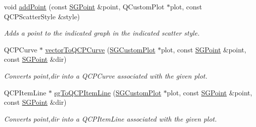 \begin{DoxyCompactItemize}
void \hyperlink{classSGSolutionHandler_a86d0a38bc3afbe289ddb0844d02f69bb}{add\+Point} (const \hyperlink{classSGPoint}{S\+G\+Point} \&point, Q\+Custom\+Plot $\ast$plot, const Q\+C\+P\+Scatter\+Style \&style)
\begin{DoxyCompactList}\small\item\em Adds a point to the indicated graph in the indicated scatter style. \end{DoxyCompactList}\item 
\mbox{\label{classSGSolutionHandler_aa1220e94bb920a7d67276385510ba5f8}} 
Q\+C\+P\+Curve $\ast$ \hyperlink{classSGSolutionHandler_aa1220e94bb920a7d67276385510ba5f8}{vector\+To\+Q\+C\+P\+Curve} (\hyperlink{classSGCustomPlot}{S\+G\+Custom\+Plot} $\ast$plot, const \hyperlink{classSGPoint}{S\+G\+Point} \&point, const \hyperlink{classSGPoint}{S\+G\+Point} \&dir)
\begin{DoxyCompactList}\small\item\em Converts point,dir into a Q\+C\+P\+Curve associated with the given plot. \end{DoxyCompactList}\item 
\mbox{\label{classSGSolutionHandler_a6ecc89647ccab2bea37cb994eb1764c2}} 
Q\+C\+P\+Item\+Line $\ast$ \hyperlink{classSGSolutionHandler_a6ecc89647ccab2bea37cb994eb1764c2}{sg\+To\+Q\+C\+P\+Item\+Line} (\hyperlink{classSGCustomPlot}{S\+G\+Custom\+Plot} $\ast$plot, const \hyperlink{classSGPoint}{S\+G\+Point} \&point, const \hyperlink{classSGPoint}{S\+G\+Point} \&dir)
\begin{DoxyCompactList}\small\item\em Converts point,dir into a Q\+C\+P\+Item\+Line associated with the given plot. \end{DoxyCompactList}\end{DoxyCompactItemize}
